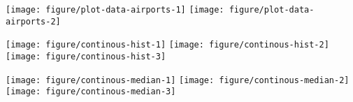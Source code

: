 \documentclass{article}\usepackage[]{graphicx}\usepackage[]{color}
\newenvironment{knitrout}{}{} %
\begin{document}
\begin{landscape}
\begin{knitrout}
\color{fgcolor}

{\centering \texttt{[image: figure/plot-data-airports-1]} 
\texttt{[image: figure/plot-data-airports-2]} 

}



\end{knitrout}
\vspace{3 mm}



\begin{knitrout}
\color{fgcolor}

{\centering \texttt{[image: figure/continous-hist-1]} 
\texttt{[image: figure/continous-hist-2]} 
\texttt{[image: figure/continous-hist-3]} 

}



\end{knitrout}
\vspace{2 mm}

\begin{knitrout}
\color{fgcolor}

{\centering \texttt{[image: figure/continous-median-1]} 
\texttt{[image: figure/continous-median-2]} 
\texttt{[image: figure/continous-median-3]} 

}



\end{knitrout}
\end{landscape}
\end{document}
